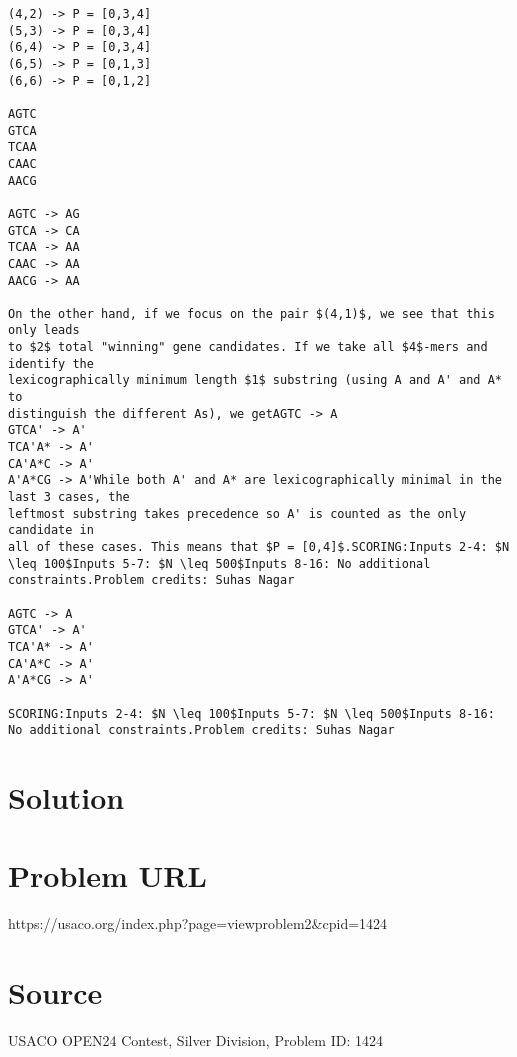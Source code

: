 \documentclass[12pt]{article}
\begin{document}
\begin{verbatim}
(4,2) -> P = [0,3,4]
(5,3) -> P = [0,3,4]
(6,4) -> P = [0,3,4]
(6,5) -> P = [0,1,3]
(6,6) -> P = [0,1,2]

AGTC
GTCA
TCAA
CAAC
AACG

AGTC -> AG
GTCA -> CA
TCAA -> AA
CAAC -> AA
AACG -> AA

On the other hand, if we focus on the pair $(4,1)$, we see that this only leads
to $2$ total "winning" gene candidates. If we take all $4$-mers and identify the
lexicographically minimum length $1$ substring (using A and A' and A* to
distinguish the different As), we getAGTC -> A
GTCA' -> A'
TCA'A* -> A'
CA'A*C -> A'
A'A*CG -> A'While both A' and A* are lexicographically minimal in the last 3 cases, the
leftmost substring takes precedence so A' is counted as the only candidate in
all of these cases. This means that $P = [0,4]$.SCORING:Inputs 2-4: $N \leq 100$Inputs 5-7: $N \leq 500$Inputs 8-16: No additional constraints.Problem credits: Suhas Nagar

AGTC -> A
GTCA' -> A'
TCA'A* -> A'
CA'A*C -> A'
A'A*CG -> A'

SCORING:Inputs 2-4: $N \leq 100$Inputs 5-7: $N \leq 500$Inputs 8-16: No additional constraints.Problem credits: Suhas Nagar
\end{verbatim}

\section*{Solution}


\section*{Problem URL}
https://usaco.org/index.php?page=viewproblem2&cpid=1424

\section*{Source}
USACO OPEN24 Contest, Silver Division, Problem ID: 1424
\end{document}
